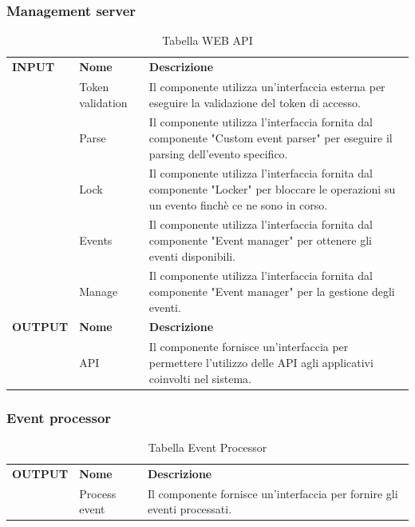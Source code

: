 \documentclass{article}
\begin{document}
\clearpage

\subsubsection{Management server}

\begin{table}[htbp]
    \centering
    \renewcommand{\arraystretch}{1.3} %
    \begin{tabularx}{\textwidth}{| l | l | X |}
        \Xhline{2pt}
        \textbf{INPUT} & \textbf{Nome} & \textbf{Descrizione} \\
        \Xhline{2pt}
         & Token validation & Il componente utilizza un'interfaccia esterna per eseguire la validazione del token di accesso. \\
        \hline
         & Parse & Il componente utilizza l'interfaccia fornita dal componente "Custom event parser" per eseguire il parsing dell'evento specifico. \\
        \hline
         & Lock & Il componente utilizza l'interfaccia fornita dal componente "Locker" per bloccare le operazioni su un evento finchè ce ne sono in corso. \\
        \hline
         & Events & Il componente utilizza l'interfaccia fornita dal componente "Event manager" per ottenere gli eventi disponibili. \\
        \hline
        & Manage & Il componente utilizza l'interfaccia fornita dal componente "Event manager" per la gestione degli eventi. \\
        \Xhline{2pt}
        \textbf{OUTPUT} & \textbf{Nome} & \textbf{Descrizione} \\
        \Xhline{2pt}
         & API & Il componente fornisce un'interfaccia per permettere l'utilizzo delle API agli applicativi coinvolti nel sistema. \\
        \hline
    \end{tabularx}
    \caption{Tabella WEB API}
\end{table}

\subsubsection{Event processor}


\begin{table}[htbp]
    \centering
    \renewcommand{\arraystretch}{1.3} %
    \begin{tabularx}{\textwidth}{| l | l | X |}
        \Xhline{2pt}
        \textbf{OUTPUT} & \textbf{Nome} & \textbf{Descrizione} \\
        \Xhline{2pt}
         & Process event & Il componente fornisce un'interfaccia per fornire gli eventi processati. \\
        \hline
    \end{tabularx}
    \caption{Tabella Event Processor}
\end{table}
\end{document}
